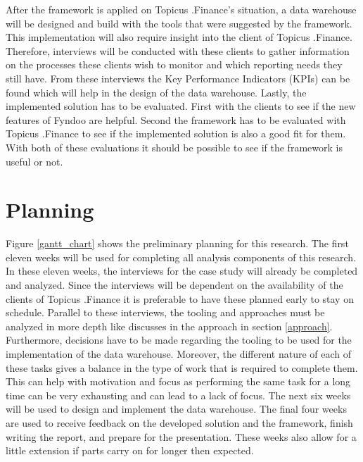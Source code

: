 \documentclass[11pt]{article}
\begin{document}
After the framework is applied on Topicus .Finance's situation, a data warehouse will be designed and build with the tools that were suggested by the framework. This implementation will also require insight into the client of Topicus .Finance. Therefore, interviews will be conducted with these clients to gather information on the processes these clients wish to monitor and which reporting needs they still have. From these interviews the Key Performance Indicators (KPIs) can be found which will help in the design of the data warehouse. Lastly, the implemented solution has to be evaluated. First with the clients to see if the new features of Fyndoo are helpful. Second the framework has to be evaluated with Topicus .Finance to see if the implemented solution is also a good fit for them. With both of these evaluations it should be possible to see if the framework is useful or not.

\section{Planning}
\label{planning}
Figure \ref{gantt_chart} shows the preliminary planning for this research. The first eleven weeks will be used for completing all analysis components of this research. In these eleven weeks, the interviews for the case study will already be completed and analyzed. Since the interviews will be dependent on the availability of the clients of Topicus .Finance it is preferable to have these planned early to stay on schedule. Parallel to these interviews, the tooling and approaches must be analyzed in more depth like discusses in the approach in section \ref{approach}. Furthermore, decisions have to be made regarding the tooling to be used for the implementation of the data warehouse. Moreover, the different nature of each of these tasks gives a balance in the type of work that is required to complete them. This can help with motivation and focus as performing the same task for a long time can be very exhausting and can lead to a lack of focus. The next six weeks will be used to design and implement the data warehouse. The final four weeks are used to receive feedback on the developed solution and the framework, finish writing the report, and prepare for the presentation. These weeks also allow for a little extension if parts carry on for longer then expected.
\end{document}
